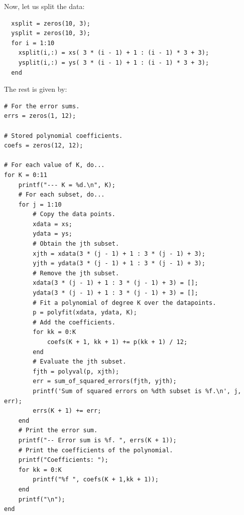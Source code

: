 \documentclass[10pt]{article}
\begin{document}
\begin{itemize}
  \color{black}
  Now, let us split the data:
  \begin{verbatim}
  xsplit = zeros(10, 3);
  ysplit = zeros(10, 3);
  for i = 1:10
    xsplit(i,:) = xs( 3 * (i - 1) + 1 : (i - 1) * 3 + 3);
    ysplit(i,:) = ys( 3 * (i - 1) + 1 : (i - 1) * 3 + 3);
  end
  \end{verbatim}
  The rest is given by:
  \begin{verbatim}# For the error sums.
errs = zeros(1, 12);

# Stored polynomial coefficients.
coefs = zeros(12, 12);

# For each value of K, do...
for K = 0:11
    printf("--- K = %d.\n", K);
    # For each subset, do...
    for j = 1:10
        # Copy the data points.
        xdata = xs;
        ydata = ys;
        # Obtain the jth subset.
        xjth = xdata(3 * (j - 1) + 1 : 3 * (j - 1) + 3);
        yjth = ydata(3 * (j - 1) + 1 : 3 * (j - 1) + 3);
        # Remove the jth subset.
        xdata(3 * (j - 1) + 1 : 3 * (j - 1) + 3) = [];
        ydata(3 * (j - 1) + 1 : 3 * (j - 1) + 3) = [];
        # Fit a polynomial of degree K over the datapoints.
        p = polyfit(xdata, ydata, K);
        # Add the coefficients.
        for kk = 0:K
            coefs(K + 1, kk + 1) += p(kk + 1) / 12;
        end
        # Evaluate the jth subset.
        fjth = polyval(p, xjth);
        err = sum_of_squared_errors(fjth, yjth);
        printf('Sum of squared errors on %dth subset is %f.\n', j, err);
        errs(K + 1) += err;
    end
    # Print the error sum.
    printf("-- Error sum is %f. ", errs(K + 1));
    # Print the coefficients of the polynomial.
    printf("Coefficients: ");
    for kk = 0:K
        printf("%f ", coefs(K + 1,kk + 1));
    end
    printf("\n");
end


\end{verbatim}
\end{itemize}
\end{document}
